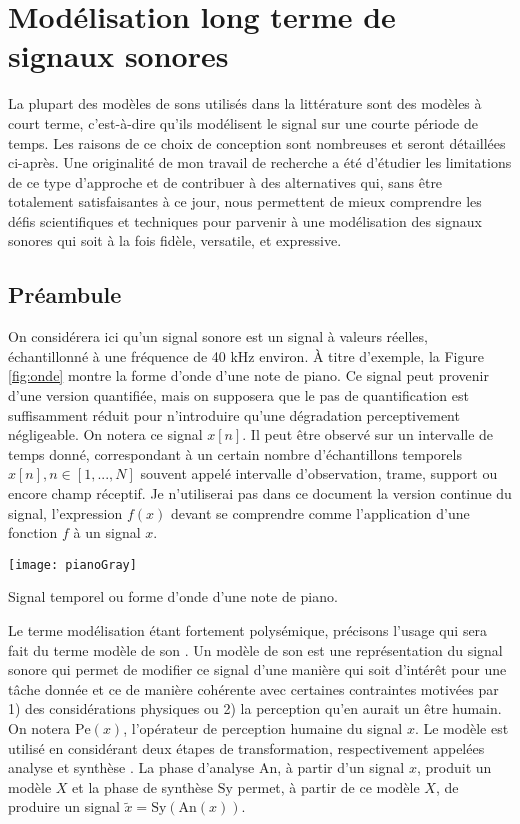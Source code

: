 \chapter{\nmu Modélisation long terme de signaux sonores} \label{chap:modeles}

La plupart des modèles de sons utilisés dans la littérature sont des modèles à court terme, c'est-à-dire qu'ils modélisent le signal sur une courte période de temps. Les raisons de ce choix de conception sont nombreuses et seront détaillées ci-après. Une originalité de mon travail de recherche a été d'étudier les limitations de ce type d'approche et de contribuer à des alternatives qui, sans être totalement satisfaisantes à ce jour, nous permettent de mieux comprendre les défis scientifiques et techniques pour parvenir à une modélisation des signaux sonores qui soit à la fois fidèle, versatile, et expressive.

\section{ \nmu Préambule}

On considérera ici qu'un signal sonore est un signal à valeurs réelles, échantillonné à une fréquence de 40 kHz environ. \`A titre d'exemple, la Figure \ref{fig:onde} montre la forme d'onde d'une note de piano. Ce signal peut provenir d'une version quantifiée, mais on supposera que le pas de quantification est suffisamment réduit pour n'introduire qu'une dégradation perceptivement négligeable. On notera ce signal $x[n]$. Il peut être observé sur un intervalle de temps donné, correspondant à un certain nombre d'échantillons temporels $x[n], n \in [1, ..., N]$ souvent appelé intervalle d'observation, trame, support ou encore champ réceptif. Je n'utiliserai pas dans ce document la version continue du signal, l'expression $f(x)$ devant se comprendre comme l'application d'une fonction $f$ à un signal $x$.

\begin{marginfigure}
  \texttt{[image: pianoGray]}
  \caption{Signal temporel ou forme d'onde d'une note de piano.}
  \label{fig:onde}
\end{marginfigure}

Le terme modélisation étant fortement polysémique, précisons l'usage qui sera fait du terme \og modèle de son \fg. Un modèle de son est une représentation du signal sonore qui permet de modifier ce signal d'une manière qui soit d'intérêt pour une tâche donnée et ce de manière cohérente avec certaines contraintes motivées par 1) des considérations physiques ou 2) la perception qu'en aurait un être humain. On notera $\mathrm{Pe}(x)$, l'opérateur de perception humaine du signal $x$.  Le modèle est utilisé en considérant deux étapes de transformation, respectivement appelées \og analyse \fg et \og synthèse \fg. La phase d'analyse $\mathrm{An}$, à partir d'un signal $x$, produit un modèle $X$ et la phase de synthèse $\mathrm{Sy}$ permet, à partir de ce modèle $X$, de produire un signal $\tilde{x}=\mathrm{Sy}(\mathrm{An}(x))$.

